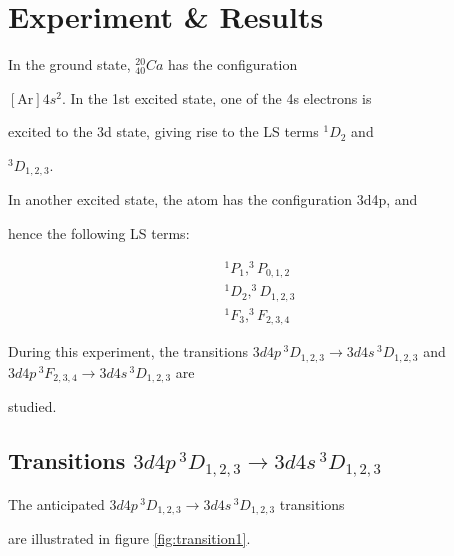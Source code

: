 \documentclass[a4paper]{article}
\begin{document}

\section{Experiment \& Results}

In the ground state, $^{20}_{40}Ca$ has the configuration

$[\mathrm{Ar}]4s^2$. In the 1st excited state, one of the 4s electrons is

excited to the 3d state, giving rise to the LS terms $^1D_2$ and

$^3D_{1,2,3}$.

In another excited state, the atom has the configuration 3d4p, and

hence the following LS terms:

\[

\begin{array}{c}

^1P_1, ^3P_{0, 1, 2}\\

^1D_2, ^3D_{1,2,3} \\

^1F_3, ^3F_{2,3,4}

\end{array}

\]

During this experiment, the transitions $3d4p\,^3D_{1,2,3} \to

3d4s\,^3D_{1,2,3}$ and $3d4p\,^3F_{2,3,4} \to 3d4s\,^3D_{1,2,3}$ are

studied.

\subsection{Transitions $3d4p\,^3D_{1,2,3} \to 3d4s\,^3D_{1,2,3}$}

The anticipated $3d4p\,^3D_{1,2,3} \to 3d4s\,^3D_{1,2,3}$ transitions

are illustrated in figure \ref{fig:transition1}.
\end{document}
